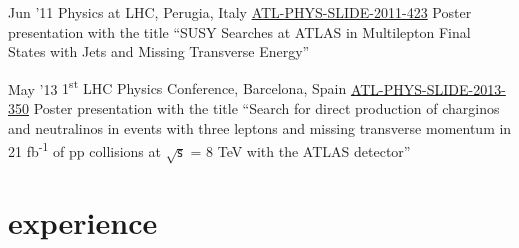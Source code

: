 \documentclass[]{cv} %
\begin{document}
\begin{entrylist}

  \entry
  {Jun '11}
  {Physics at LHC, Perugia, Italy}
  {\href{https://cds.cern.ch/record/1371922}{ATL-PHYS-SLIDE-2011-423}}
  {Poster presentation with the title ``SUSY Searches at ATLAS in Multilepton Final States with Jets and Missing Transverse Energy''}

  \entry
  {May '13}
  {1\textsuperscript{st} LHC Physics Conference, Barcelona, Spain}
  {\href{https://cds.cern.ch/record/1555743}{ATL-PHYS-SLIDE-2013-350}}
  {Poster presentation with the title ``Search for direct production of charginos and neutralinos in events with three
    leptons and missing transverse momentum in 21 fb\textsuperscript{-1} of pp collisions at $\sqrt{\mathsf{s}}$ = 8 TeV with the ATLAS
detector''}

\end{entrylist}

\section{experience}
\end{document}
